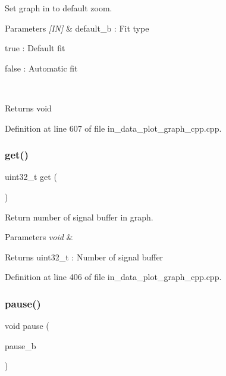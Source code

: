 Set graph in to default zoom. 


\begin{DoxyParams}{Parameters}
{\em \mbox{[}\+I\+N\mbox{]}} & default\+\_\+b \+: Fit type \begin{DoxyItemize}
\item true \+: Default fit \item false \+: Automatic fit \end{DoxyItemize}
\\
\hline
\end{DoxyParams}
\begin{DoxyReturn}{Returns}
void 
\end{DoxyReturn}


Definition at line 607 of file in\+\_\+data\+\_\+plot\+\_\+graph\+\_\+cpp.\+cpp.

\mbox{\label{group__data__plot_gae5dcab1d0aea67a38b798ef5a58de49f}} 
\subsubsection{get()}
{\footnotesize\ttfamily uint32\+\_\+t get (\begin{DoxyParamCaption}\item[{void}]{ }\end{DoxyParamCaption})}



Return number of signal buffer in graph. 


\begin{DoxyParams}{Parameters}
{\em void} & \\
\hline
\end{DoxyParams}
\begin{DoxyReturn}{Returns}
uint32\+\_\+t \+: Number of signal buffer 
\end{DoxyReturn}


Definition at line 406 of file in\+\_\+data\+\_\+plot\+\_\+graph\+\_\+cpp.\+cpp.

\mbox{\label{group__data__plot_gac60ddfa1938a225b740a4073d61e4ace}} 
\subsubsection{pause()}
{\footnotesize\ttfamily void pause (\begin{DoxyParamCaption}\item[{bool}]{pause\+\_\+b }\end{DoxyParamCaption})}



